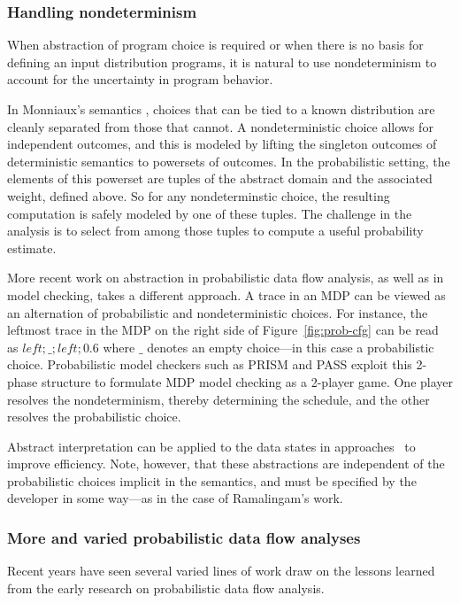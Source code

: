 \subsubsection{Handling nondeterminism}
When abstraction of program choice is required or when 
there is no basis for defining an input distribution programs,
it is natural to use nondeterminism to account for the uncertainty
in program behavior.

In Monniaux's semantics \cite{monniaux2005abstract}, choices that can be tied to a known
distribution are cleanly separated from those that cannot.
A nondeterministic choice allows for independent outcomes, and
this is modeled by lifting the singleton outcomes of deterministic
semantics to powersets of outcomes.
In the probabilistic setting, the elements of this powerset are
tuples of the abstract domain and the associated weight, defined
above.  So for any nondeterminstic choice, the resulting computation 
is safely modeled by one of these tuples.  The challenge in the
analysis is to select from among those tuples to compute a useful
probability estimate.

More recent work on abstraction in probabilistic data flow
analysis, as well as in model checking, takes a different approach.
A trace in an MDP can be viewed as an alternation of
probabilistic and nondeterministic choices.  For instance, the
leftmost trace in the MDP on the right side of Figure~\ref{fig:prob-cfg}
can be read as $\mathit{left};\_;\mathit{left};0.6$ where $\_$ 
denotes an empty choice---in this case a probabilistic choice.
Probabilistic model checkers such as PRISM and PASS exploit this
2-phase structure to formulate MDP model checking as a 2-player
game.  One player resolves the nondeterminism, thereby determining
the schedule, and the other resolves the probabilistic choice.

Abstract interpretation can be applied to the data states in
approaches~\cite{kwiatkowska2011prism,wachter2010best,esparza2011probabilistic}
to improve efficiency.  Note, however, that these abstractions are
independent of the probabilistic choices implicit in the semantics, and must be specified
by the developer in some way---as in the case of Ramalingam's work.

\subsubsection{More and varied probabilistic data flow analyses}
Recent years have seen several varied lines of work draw on
the lessons learned from the early research on probabilistic
data flow analysis.

